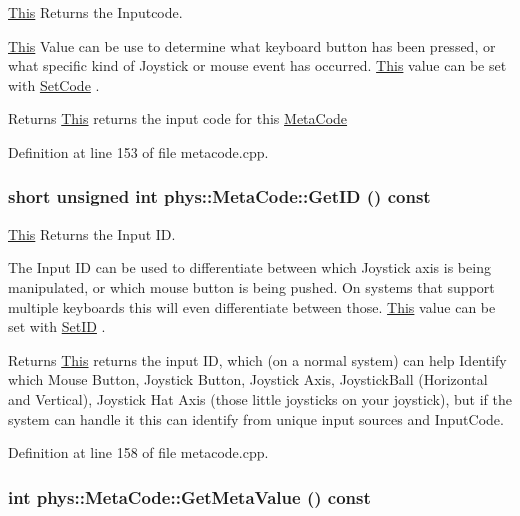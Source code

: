 \hyperlink{structThis}{This} Returns the Inputcode. 

\hyperlink{structThis}{This} Value can be use to determine what keyboard button has been pressed, or what specific kind of Joystick or mouse event has occurred. \hyperlink{structThis}{This} value can be set with \hyperlink{classphys_1_1MetaCode_ab6759fbee9d039cf248bf76dde0f33dd}{SetCode} . \begin{DoxyReturn}{Returns}
\hyperlink{structThis}{This} returns the input code for this \hyperlink{classphys_1_1MetaCode}{MetaCode} 
\end{DoxyReturn}


Definition at line 153 of file metacode.cpp.

\hypertarget{classphys_1_1MetaCode_a70389ebd99493248fe93c598e2fe06c9}{
\subsubsection[{GetID}]{\setlength{\rightskip}{0pt plus 5cm}short unsigned int phys::MetaCode::GetID () const}}
\label{da/dc9/classphys_1_1MetaCode_a70389ebd99493248fe93c598e2fe06c9}


\hyperlink{structThis}{This} Returns the Input ID. 

The Input ID can be used to differentiate between which Joystick axis is being manipulated, or which mouse button is being pushed. On systems that support multiple keyboards this will even differentiate between those. \hyperlink{structThis}{This} value can be set with \hyperlink{classphys_1_1MetaCode_a0ef70c11c06f0e3015121985cb1b6153}{SetID} . \begin{DoxyReturn}{Returns}
\hyperlink{structThis}{This} returns the input ID, which (on a normal system) can help Identify which Mouse Button, Joystick Button, Joystick Axis, JoystickBall (Horizontal and Vertical), Joystick Hat Axis (those little joysticks on your joystick), but if the system can handle it this can identify from unique input sources and InputCode. 
\end{DoxyReturn}


Definition at line 158 of file metacode.cpp.

\hypertarget{classphys_1_1MetaCode_ad8e7e4e7c6cdc6a05b8522910ce90cd4}{
\subsubsection[{GetMetaValue}]{\setlength{\rightskip}{0pt plus 5cm}int phys::MetaCode::GetMetaValue () const}}
\label{da/dc9/classphys_1_1MetaCode_ad8e7e4e7c6cdc6a05b8522910ce90cd4}


